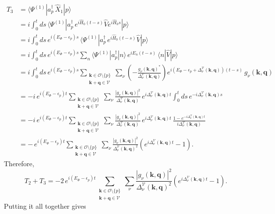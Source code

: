 \begin{align}
T_3&=\langle\Psi^{(1)}|a_p^\dagger\,\hat X_1|p\rangle\\
&=i\int_0^t\!ds\,\langle\Psi^{(1)}|a_p^\dagger\,e^{i\hat H_0(t-s)}\hat V e^{i\hat H_0s}|p\rangle\\
&=i\int_0^t\!ds\,e^{i(E_\Phi-\epsilon_p)s}\,\langle\Psi^{(1)}|a_p^\dagger\,e^{i\hat H_0(t-s)}\hat V|p\rangle\\
&=i\int_0^t\!ds\,e^{i(E_\Phi-\epsilon_p)s}\sum_n\langle\Psi^{(1)}|a_p^\dagger|n\rangle\,e^{iE_n(t-s)}\,\langle n|\hat V|p\rangle \\&=i\int_0^t\!ds\,e^{i(E_\Phi-\epsilon_p)s}
\sum_{\substack{\bm k\in\mathcal O\setminus\{p\}\\ \bm k+\bm q\in\mathcal V}}\sum_\nu
\left(-\frac{g_\nu(\bm k,\bm q)^*}{\Delta^{\mathcal V}_\nu(\bm k,\bm q)}\right)
e^{i\left(E_\Phi-\epsilon_p+\Delta^{\mathcal V}_\nu(\bm k,\bm q)\right)(t-s)}\,g_\nu(\bm k,\bm q)\\
&=-i\,e^{i(E_\Phi-\epsilon_p)t}\sum_{\substack{\bm k\in\mathcal O\setminus\{p\}\\ \bm k+\bm q\in\mathcal V}}\sum_\nu
\frac{|g_\nu(\bm k,\bm q)|^2}{\Delta^{\mathcal V}_\nu(\bm k,\bm q)}\,e^{i\Delta^{\mathcal V}_\nu(\bm k,\bm q)t}\int_0^t\!ds\,e^{-i\Delta^{\mathcal V}_\nu(\bm k,\bm q)s}\\
&=-i\,e^{i(E_\Phi-\epsilon_p)t}\sum_{\substack{\bm k\in\mathcal O\setminus\{p\}\\ \bm k+\bm q\in\mathcal V}}\sum_\nu
\frac{|g_\nu(\bm k,\bm q)|^2}{\Delta^{\mathcal V}_\nu(\bm k,\bm q)}\,e^{i\Delta^{\mathcal V}_\nu(\bm k,\bm q)t}\,
\frac{1-e^{-i\Delta^{\mathcal V}_\nu(\bm k,\bm q)t}}{i\Delta^{\mathcal V}_\nu(\bm k,\bm q)}\\
&=-\,e^{i(E_\Phi-\epsilon_p)t}\sum_{\substack{\bm k\in\mathcal O\setminus\{p\}\\ \bm k+\bm q\in\mathcal V}}\sum_\nu
\frac{|g_\nu(\bm k,\bm q)|^2}{\Delta^{\mathcal V}_\nu(\bm k,\bm q)^2}\left(e^{i\Delta^{\mathcal V}_\nu(\bm k,\bm q)t}-1\right).
\end{align}
Therefore,
\begin{equation}
T_2+T_3=-2\,e^{i(E_\Phi-\epsilon_p)t}\sum_{\substack{\bm k\in\mathcal O\setminus\{p\}\\ \bm k+\bm q\in\mathcal V}}\sum_\nu
\frac{|g_\nu(\bm k,\bm q)|^2}{\Delta^{\mathcal V}_\nu(\bm k,\bm q)^2}\left(e^{i\Delta^{\mathcal V}_\nu(\bm k,\bm q)t}-1\right).
\end{equation}
Putting it all together gives 
